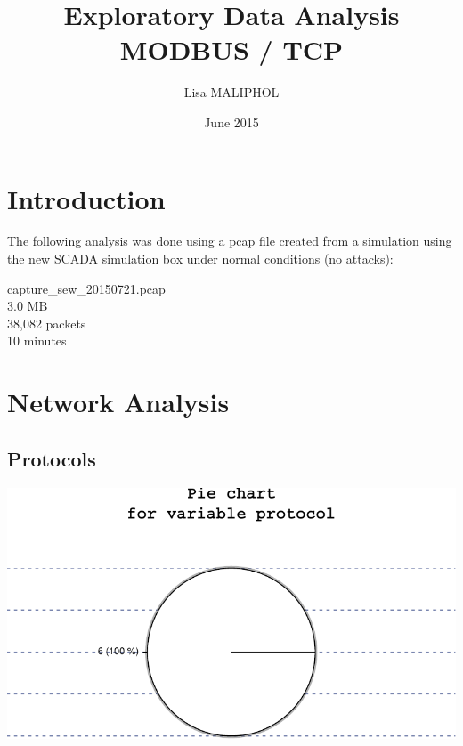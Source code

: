 \documentclass[]{article}
\title{Exploratory Data Analysis\\MODBUS / TCP}
\author{Lisa MALIPHOL}
\date{June 2015}
\begin{document}
\maketitle


\section{Introduction}\label{introduction}

The following analysis was done using a pcap file created from a
simulation using the new SCADA simulation box under normal conditions
(no attacks):

capture\_sew\_20150721.pcap\\3.0 MB\\38,082 packets\\10 minutes

\section{Network Analysis}\label{network-analysis}

\subsection{Protocols}\label{protocols}

\includegraphics{sew_files/figure-latex/unnamed-chunk-3-1.pdf}
\end{document}
